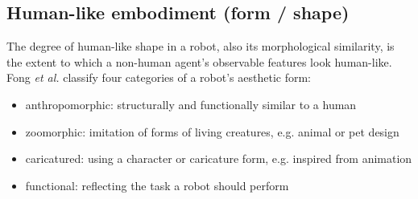 \documentclass[lettersize, apacite, twoside, HRI]{apa_HRI}
\begin{document}
\subsection{Human-like embodiment (form / shape)}
\label{sec:4.1}

	The degree of human-like shape in a robot, also its morphological similarity, is the extent to which a non-human agent's observable features look human-like. \cite{epley_seeing_2007} Fong \textit{et al.} classify four categories of a robot's aesthetic form: \cite{fong_survey_2003}
	
\begin{itemize}
	\item anthropomorphic: structurally and functionally similar to a human
	\item zoomorphic: imitation of forms of living creatures, e.g. animal or pet design
	\item caricatured: using a character or caricature form, e.g. inspired from animation
	\item functional: reflecting the task a robot should perform
\end{itemize}
\end{document}
